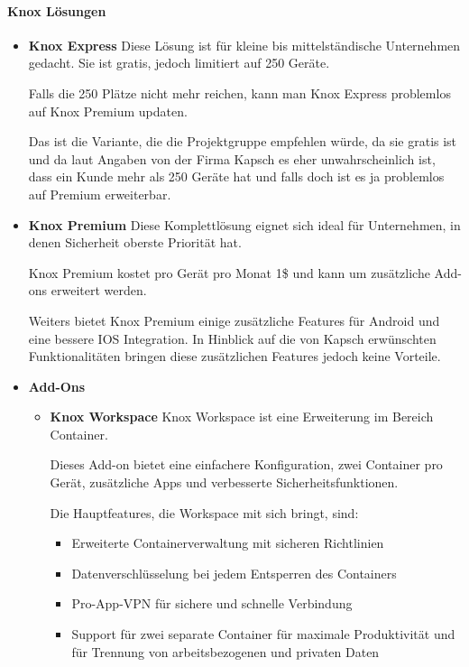 \paragraph{Knox Lösungen}
\begin{itemize}
	\item \textbf{Knox Express} \newline
	Diese Lösung ist für kleine bis mittelständische Unternehmen gedacht. Sie ist gratis, jedoch limitiert auf 250 Geräte. \par Falls die 250 Plätze nicht mehr reichen, kann man Knox Express problemlos auf Knox Premium updaten. \par Das ist die Variante, die die Projektgruppe empfehlen würde, da sie gratis ist und da laut Angaben von der Firma Kapsch es eher unwahrscheinlich ist, dass ein Kunde mehr als 250 Geräte hat und falls doch ist es ja problemlos auf Premium erweiterbar.
	\item \textbf{Knox Premium} \newline
	Diese Komplettlösung eignet sich ideal für Unternehmen, in denen Sicherheit oberste Priorität hat. \par Knox Premium kostet pro Gerät pro Monat 1\$ und kann um zusätzliche Add-ons erweitert werden. \par Weiters bietet Knox Premium einige zusätzliche Features für Android und eine bessere IOS Integration. In Hinblick auf die von Kapsch erwünschten Funktionalitäten bringen diese zusätzlichen Features jedoch keine Vorteile.
	\item \textbf{Add-Ons}
	\begin{itemize}
		\item \textbf{Knox Workspace} \newline
		Knox Workspace ist eine Erweiterung im Bereich Container. \par Dieses Add-on bietet eine einfachere Konfiguration, zwei Container pro Gerät, zusätzliche Apps und verbesserte Sicherheitsfunktionen. \par Die Hauptfeatures, die Workspace mit sich bringt, sind: 
		\begin{itemize}
			\item Erweiterte Containerverwaltung mit sicheren Richtlinien
			\item Datenverschlüsselung bei jedem Entsperren des Containers
			\item Pro-App-VPN für sichere und schnelle Verbindung
			\item Support für zwei separate Container für maximale Produktivität und für Trennung von arbeitsbezogenen und privaten Daten

\end{itemize}
\end{itemize}
\end{itemize}
